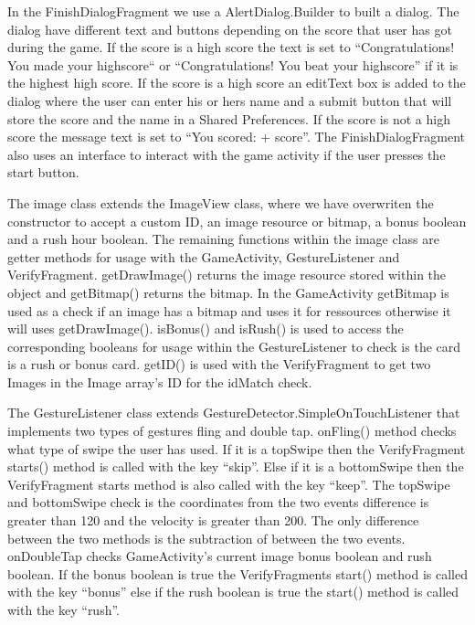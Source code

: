 In the FinishDialogFragment we use a AlertDialog.Builder to built a dialog. The dialog have different text and buttons depending on the score that user has got during the game. If the score is a high score the text is set to “Congratulations! You made your highscore“ or “Congratulations! You beat your highscore” if it is the highest high score. If the score is a high score an editText box is added to the dialog where the user can enter his or hers name and a submit button that will store the score and the name in a Shared Preferences. If the score is not a high score the message text is set to “You scored: + score”.
The FinishDialogFragment also uses an interface to interact with the game activity if the user presses the start button. \newline

The image class extends the ImageView class, where we have overwriten the constructor to accept a custom ID, an image resource or bitmap, a bonus boolean and a rush hour boolean. The remaining functions within the image class are getter methods for usage with the GameActivity, GestureListener and VerifyFragment. getDrawImage() returns the image resource stored within the object and getBitmap() returns the bitmap. In the GameActivity getBitmap is used as a check if an image has a bitmap and uses it for ressources otherwise it will uses getDrawImage(). isBonus() and isRush() is used to access the corresponding booleans for usage within the GestureListener to check is the card is a rush or bonus card. getID() is used with the VerifyFragment to get two Images in the Image array’s ID for the idMatch check. \newline

The GestureListener class extends GestureDetector.SimpleOnTouchListener that implements two types of gestures fling and double tap. onFling() method checks what type of swipe the user has used. If it is a topSwipe then the VerifyFragment starts() method is called with the key “skip”. Else if it is a bottomSwipe then the VerifyFragment starts method is also called with the key “keep”. The topSwipe and bottomSwipe check is the coordinates from the two events difference is greater than 120 and the velocity is greater than 200. The only difference between the two methods is the subtraction of between the two events. onDoubleTap checks GameActivity’s current image bonus boolean and rush boolean. If the bonus boolean is true the VerifyFragments start() method is called with the key “bonus” else if the rush boolean is true the start() method is called with the key “rush”. \newline

